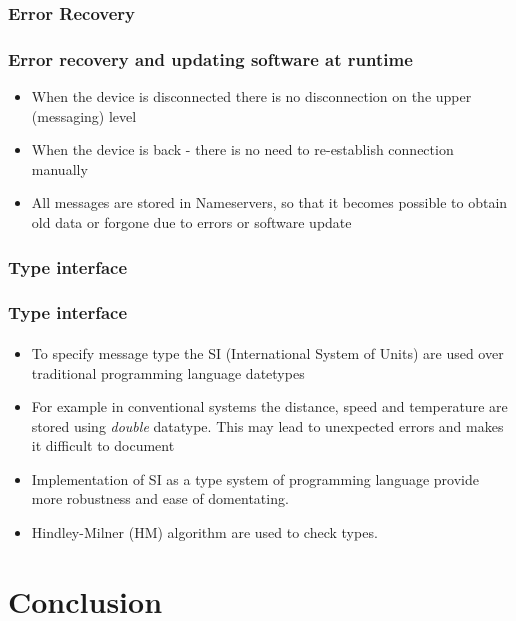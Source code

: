 \documentclass{beamer}
\begin{document}
\subsubsection{Error Recovery}
\begin{frame}
\frametitle{Error recovery and updating software at runtime}
\begin{itemize}
  \item When the device is disconnected there is no disconnection on the
  upper (messaging) level
  \item When the device is back - there is no need to re-establish connection
  manually
  \item All messages are stored in Nameservers, so that it becomes possible to
  obtain old data or forgone due to errors or software update
\end{itemize}

\end{frame}


\subsubsection{Type interface}
\begin{frame}
\frametitle{Type interface}
\framesubtitle{}
\begin{itemize}
  \item To specify message type the SI (International System of Units) are used over
traditional programming language datetypes
\item For example in conventional systems the distance, speed and temperature
are stored using \emph{double} datatype. This may lead to unexpected errors and
makes it difficult to document
\item Implementation of SI as a type system of programming language provide more
robustness and ease of domentating.
\item Hindley-Milner (HM) algorithm are used to check types.
\end{itemize}
\end{frame}

\section{Conclusion}
\end{document}
